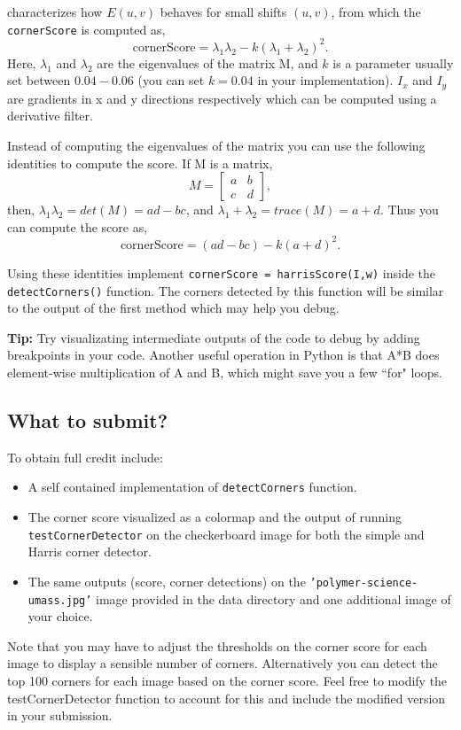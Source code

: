\documentclass[10pt,letterpaper]{article}
\newcommand{\cmd}[1] {{\color{blue}\texttt{#1}}}
\begin{document}
characterizes how $E(u,v)$ behaves for small shifts $(u,v)$, from which the \cmd{cornerScore} is computed as,
\[
	\text{cornerScore} = \lambda_1\lambda_2 - k(\lambda_1 + \lambda_2)^2.
\]
Here, $\lambda_1$ and $\lambda_2$ are the eigenvalues of the matrix M, and $k$ is a parameter usually set between $0.04 - 0.06$ (you can set $k=0.04$ in your implementation). $I_x$ and $I_y$ are gradients in x and y directions respectively which can be computed using a derivative filter.

Instead of computing the eigenvalues of the matrix you can use the following identities to compute the score. If M is a matrix, 
\[
	M = \left[ 
	\begin{array}{cc}
				a &  b \\
				c &  d \end{array} 
				\right], 
\]
then, $\lambda_1 \lambda_2 = det(M) = ad - bc$, and $\lambda_1 + \lambda_2 = trace(M) = a + d$. Thus you can compute the score as,
\[
	\text{cornerScore} = (ad - bc) - k(a+d)^2.
\]

Using these identities implement \cmd{cornerScore = harrisScore(I,w)}
inside the \cmd{detectCorners()} function. The corners detected by
this function will be similar to the output of the first
method which may help you debug.


\textbf{Tip:} Try visualizating intermediate outputs of the code to
debug by adding breakpoints in your code. Another useful operation in
Python is that A*B does element-wise multiplication of A and B, which
might save you a few ``for" loops.

\subsection{What to submit?}
To obtain full credit include:
\begin{itemize}
\item A self contained implementation of \cmd{detectCorners} function.
\item The corner score visualized as a colormap and the output of running
  \cmd{testCornerDetector} on the checkerboard image for both the
  simple and Harris corner detector.
\item The same outputs (score, corner detections) on the
  \cmd{’polymer-science-umass.jpg’} image
  provided in the data directory and one additional image of your
  choice.
\end{itemize}
Note that you may have to adjust the thresholds on the corner score
for each image to display a sensible number of corners. Alternatively
you can detect the top 100 corners for each image based on the corner
score. Feel free to modify the testCornerDetector function to account
for this and include the modified version in your submission.
\end{document}
